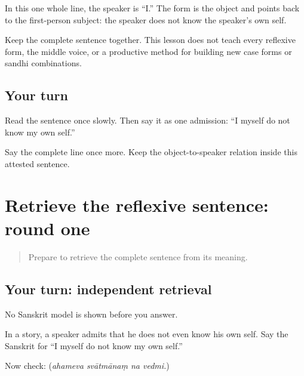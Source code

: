 \begin{grammarlens}[title={Grammar Lens: notice one relation}]
In this one whole line, the speaker is “I.” The form \textbf{} is the object and points back to the first-person subject: the speaker does not know the speaker's own self.

Keep the complete sentence together. This lesson does not teach every reflexive form, the middle voice, or a productive method for building new case forms or sandhi combinations.
\end{grammarlens}

\subsection*{Your turn}
Read the sentence once slowly. Then say it as one admission: “I myself do not know my own self.”

\begin{tcolorbox}[breakable,colback=teal!4,colframe=teal!35!black,title={Before you move on}]
Say the complete line once more. Keep the object-to-speaker relation inside this attested sentence.
\end{tcolorbox}
\section[(independent reflexive-sentence …]{Retrieve the reflexive sentence: round one}

\label{lesson:SA-C273-reflexive-first-retrieval}



\begin{quote}
Prepare to retrieve the complete sentence from its meaning.
\end{quote}

\subsection*{Your turn: independent retrieval}
No Sanskrit model is shown before you answer.

In a story, a speaker admits that he does not even know his own self. Say the Sanskrit for “I myself do not know my own self.”

\begin{grammarlens}[title={What you've built: check after answering}]
Now check: \textbf{   } (\emph{ahameva svātmānaṃ na vedmi.})
\end{grammarlens}

